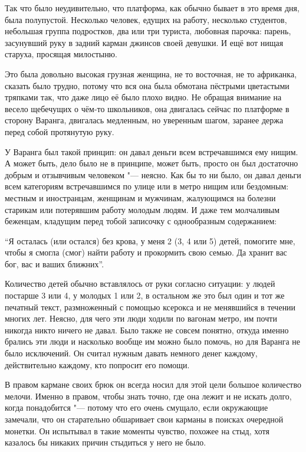Так что было неудивительно, что платформа, как обычно бывает в это время дня,
была полупустой.
Несколько человек, едущих на работу, несколько студентов, небольшая группа
подростков, два или три туриста, любовная парочка: парень, засунувший руку в
задний карман джинсов своей девушки.
И ещё вот нищая старуха, просящая милостыню.

Это была довольно высокая грузная женщина, не то восточная, не то африканка,
сказать было трудно, потому что вся она была обмотана пёстрыми цветастыми
тряпками так, что даже лицо её было плохо видно.
Не обращая внимание на весело щебечущих о чём-то школьников, она двигалась
сейчас по платформе в сторону Варанга, двигалась медленным, но уверенным шагом,
заранее держа перед собой протянутую руку.

У Варанга был такой принцип: он давал деньги всем встречавшимся ему нищим.
А может быть, дело было не в принципе, может быть, просто он был достаточно
добрым и отзывчивым человеком "--- неясно.
Как бы то ни было, он давал деньги всем категориям встречавшимся по улице или в
метро нищим или бездомным: местным и иностранцам, женщинам и мужчинам,
жалующимся на болезни старикам или потерявшим работу молодым людям.
И даже тем молчаливым беженцам, кладущим перед тобой записочку с однообразным
содержанием:

\enquote{Я осталась (или остался) без крова, у меня 2 (3, 4 или 5) детей,
помогите мне, чтобы я смогла (смог) найти работу и прокормить свою семью.
Да хранит вас бог, вас и ваших ближних}.

Количество детей обычно вставлялось от руки согласно ситуации:
у людей постарше 3 или 4, у молодых 1 или 2, в остальном же это был один и тот
же печатный текст, размноженный с помощью ксерокса и не менявшийся в течении
многих лет.
Неясно, для чего эти люди ходили по вагонам метро, им почти никогда никто ничего
не давал.
Было также не совсем понятно, откуда именно брались эти люди и насколько вообще
им можно было помочь, но для Варанга не было исключений.
Он считал нужным давать немного денег каждому, действительно каждому, кто
попросит его помощи.

В правом кармане своих брюк он всегда носил для этой цели большое количество
мелочи.
Именно в правом, чтобы знать точно, где она лежит и не искать долго, когда
понадобится "--- потому что его очень смущало, если окружающие замечали, что он
старательно обшаривает свои карманы в поисках очередной монетки.
Он испытывал в такие моменты чувство, похожее на стыд, хотя казалось бы никаких
причин стыдиться у него не было.

